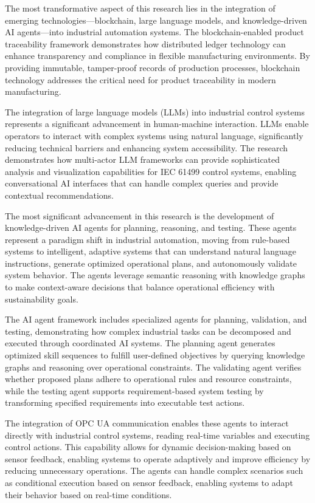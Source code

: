 The most transformative aspect of this research lies in the integration of emerging technologies—blockchain, large language models, and knowledge-driven AI agents—into industrial automation systems. The blockchain-enabled product traceability framework demonstrates how distributed ledger technology can enhance transparency and compliance in flexible manufacturing environments. By providing immutable, tamper-proof records of production processes, blockchain technology addresses the critical need for product traceability in modern manufacturing.

The integration of large language models (LLMs) into industrial control systems represents a significant advancement in human-machine interaction. LLMs enable operators to interact with complex systems using natural language, significantly reducing technical barriers and enhancing system accessibility. The research demonstrates how multi-actor LLM frameworks can provide sophisticated analysis and visualization capabilities for IEC 61499 control systems, enabling conversational AI interfaces that can handle complex queries and provide contextual recommendations.

The most significant advancement in this research is the development of knowledge-driven AI agents for planning, reasoning, and testing. These agents represent a paradigm shift in industrial automation, moving from rule-based systems to intelligent, adaptive systems that can understand natural language instructions, generate optimized operational plans, and autonomously validate system behavior. The agents leverage semantic reasoning with knowledge graphs to make context-aware decisions that balance operational efficiency with sustainability goals.

The AI agent framework includes specialized agents for planning, validation, and testing, demonstrating how complex industrial tasks can be decomposed and executed through coordinated AI systems. The planning agent generates optimized skill sequences to fulfill user-defined objectives by querying knowledge graphs and reasoning over operational constraints. The validating agent verifies whether proposed plans adhere to operational rules and resource constraints, while the testing agent supports requirement-based system testing by transforming specified requirements into executable test actions.

The integration of OPC UA communication enables these agents to interact directly with industrial control systems, reading real-time variables and executing control actions. This capability allows for dynamic decision-making based on sensor feedback, enabling systems to operate adaptively and improve efficiency by reducing unnecessary operations. The agents can handle complex scenarios such as conditional execution based on sensor feedback, enabling systems to adapt their behavior based on real-time conditions.

